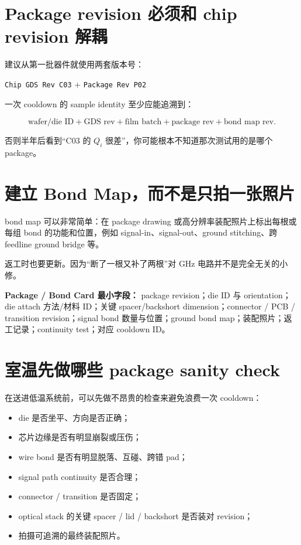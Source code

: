 \section{Package revision 必须和 chip revision 解耦}

建议从第一批器件就使用两套版本号：

\begin{center}
\texttt{Chip GDS Rev C03} \qquad + \qquad \texttt{Package Rev P02}
\end{center}

一次 cooldown 的 sample identity 至少应能追溯到：

\[
\text{wafer/die ID}
+\text{GDS rev}
+\text{film batch}
+\text{package rev}
+\text{bond map rev}.
\]

否则半年后看到“C03 的 $Q_i$ 很差”，你可能根本不知道那次测试用的是哪个 package。

\section{建立 Bond Map，而不是只拍一张照片}

bond map 可以非常简单：在 package drawing 或高分辨率装配照片上标出每根或每组 bond 的功能和位置，例如 signal-in、signal-out、ground stitching、跨 feedline ground bridge 等。

返工时也要更新。因为“断了一根又补了两根”对 GHz 电路并不是完全无关的小修。

\begin{measurebox}
\textbf{Package / Bond Card 最小字段：}
package revision；die ID 与 orientation；die attach 方法/材料 ID；关键 spacer/backshort dimension；connector / PCB / transition revision；signal bond 数量与位置；ground bond map；装配照片；返工记录；continuity test；对应 cooldown ID。
\end{measurebox}

\section{室温先做哪些 package sanity check}

在送进低温系统前，可以先做不昂贵的检查来避免浪费一次 cooldown：

\begin{itemize}
  \item die 是否坐平、方向是否正确；
  \item 芯片边缘是否有明显崩裂或压伤；
  \item wire bond 是否有明显脱落、互碰、跨错 pad；
  \item signal path continuity 是否合理；
  \item connector / transition 是否固定；
  \item optical stack 的关键 spacer / lid / backshort 是否装对 revision；
  \item 拍摄可追溯的最终装配照片。
\end{itemize}


